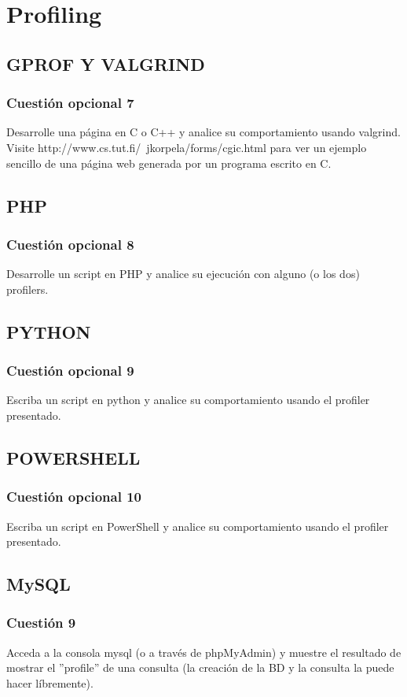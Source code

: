 \section{Profiling}
\subsection{GPROF Y VALGRIND}
\subsubsection{Cuestión opcional 7}
Desarrolle una página en C o C++ y analice su
comportamiento
usando
valgrind.
Visite
http://www.cs.tut.fi/~jkorpela/forms/cgic.html para ver un ejemplo sencillo
de una página web generada por un programa escrito en C.
\subsection{PHP}
\subsubsection{Cuestión opcional 8}
Desarrolle un script en PHP y analice su ejecución
con alguno (o los dos) profilers.
\subsection{PYTHON}
\subsubsection{Cuestión opcional 9}
Escriba un script en
python
y
analice
su
comportamiento usando el profiler presentado.

\subsection{POWERSHELL}
\subsubsection{Cuestión opcional 10}
Escriba un script en PowerShell y analice su
comportamiento usando el profiler presentado.
\subsection{MySQL}
\subsubsection{Cuestión 9}
Acceda a la consola mysql (o a través de phpMyAdmin) y
muestre el resultado de mostrar el ”profile” de una consulta (la creación de
la BD y la consulta la puede hacer líbremente).
